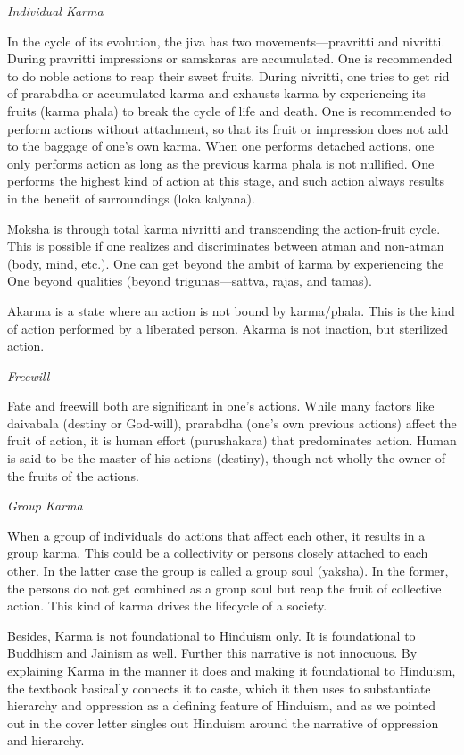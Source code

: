 \textit{Individual Karma} 

In the cycle of its evolution, the jiva has two movements—pravritti and nivritti. During pravritti impressions or samskaras are accumulated. One is recommended to do noble actions to reap their sweet fruits. During nivritti, one tries to get rid of prarabdha or accumulated karma and exhausts karma by experiencing its fruits (karma phala) to break the cycle of life and death. One is recommended to perform actions without attachment, so that its fruit or impression does not add to the baggage of one's own karma. When one performs detached actions, one only performs action as long as the previous karma phala is not nullified. One performs the highest kind of action at this stage, and such action always results in the benefit of surroundings (loka kalyana). 

Moksha is through total karma nivritti and transcending the action-fruit cycle. This is possible if one realizes and discriminates between atman and non-atman (body, mind, etc.). One can get beyond the ambit of karma by experiencing the One beyond qualities (beyond trigunas—sattva, rajas, and tamas).

Akarma is a state where an action is not bound by karma/phala. This is the kind of action performed by a liberated person. Akarma is not inaction, but sterilized action.

\textit{Freewill} 

Fate and freewill both are significant in one's actions. While many factors like daivabala (destiny or God-will), prarabdha (one's own previous actions) affect the fruit of action, it is human effort (purushakara) that predominates action. Human is said to be the master of his actions (destiny), though not wholly the owner of the fruits of the actions.

\textit{Group Karma} 

When a group of individuals do actions that affect each other, it results in a group karma. This could be a collectivity or persons closely attached to each other. In the latter case the group is called a group soul (yaksha). In the former, the persons do not get combined as a group soul but reap the fruit of collective action. This kind of karma drives the lifecycle of a society.

Besides, Karma is not foundational to Hinduism only. It is foundational to Buddhism and Jainism as well. Further this narrative is not innocuous. By explaining Karma in the manner it does and making it foundational to Hinduism, the textbook basically connects it to caste, which it then uses to substantiate hierarchy and oppression as a defining feature of Hinduism, and as we pointed out in the cover letter singles out Hinduism around the narrative of oppression and hierarchy.

